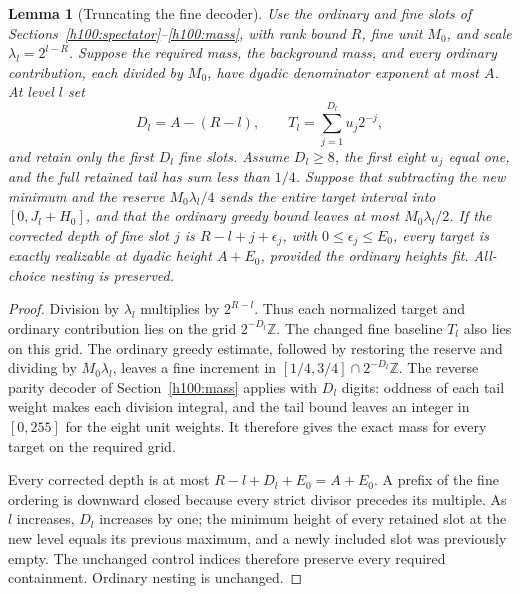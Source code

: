 \documentclass[11pt]{article}
\numberwithin{equation}{section}
\newtheorem{lemma}[theorem]{Lemma}
\theoremstyle{definition}
\theoremstyle{remark}
\begin{document}
\begin{lemma}[Truncating the fine decoder]\label{v2:lem:rank-truncation}
Use the ordinary and fine slots of Sections~\ref{h100:spectator}--\ref{h100:mass}, with rank bound $R$, fine unit $M_0$, and scale $\lambda_l=2^{l-R}$. Suppose the required mass, the background mass, and every ordinary contribution, each divided by $M_0$, have dyadic denominator exponent at most $A$. At level $l$ set
\[
 D_l=A-(R-l),\qquad T_l=\sum_{j=1}^{D_l}u_j2^{-j},
\]
and retain only the first $D_l$ fine slots. Assume $D_l\geq8$, the first eight $u_j$ equal one, and the full retained tail has sum less than $1/4$. Suppose that subtracting the new minimum and the reserve $M_0\lambda_l/4$ sends the entire target interval into $[0,J_l+H_0]$, and that the ordinary greedy bound leaves at most $M_0\lambda_l/2$. If the corrected depth of fine slot $j$ is $R-l+j+\epsilon_j$, with $0\leq\epsilon_j\leq E_0$, every target is exactly realizable at dyadic height $A+E_0$, provided the ordinary heights fit. All-choice nesting is preserved.
\end{lemma}
\begin{proof}
Division by $\lambda_l$ multiplies by $2^{R-l}$. Thus each normalized target and ordinary contribution lies on the grid $2^{-D_l}\mathbb Z$. The changed fine baseline $T_l$ also lies on this grid. The ordinary greedy estimate, followed by restoring the reserve and dividing by $M_0\lambda_l$, leaves a fine increment in $[1/4,3/4]\cap2^{-D_l}\mathbb Z$. The reverse parity decoder of Section~\ref{h100:mass} applies with $D_l$ digits: oddness of each tail weight makes each division integral, and the tail bound leaves an integer in $[0,255]$ for the eight unit weights. It therefore gives the exact mass for every target on the required grid.

Every corrected depth is at most $R-l+D_l+E_0=A+E_0$. A prefix of the fine ordering is downward closed because every strict divisor precedes its multiple. As $l$ increases, $D_l$ increases by one; the minimum height of every retained slot at the new level equals its previous maximum, and a newly included slot was previously empty. The unchanged control indices therefore preserve every required containment. Ordinary nesting is unchanged.
\end{proof}
\end{document}
